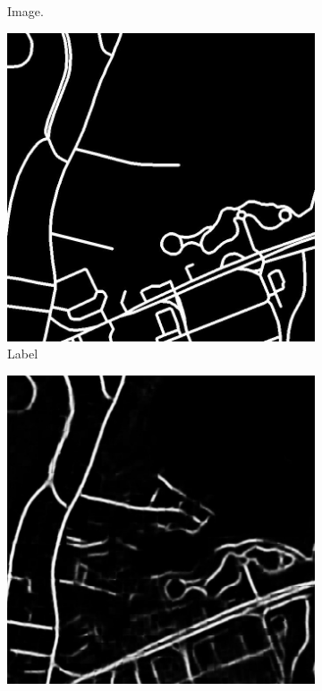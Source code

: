 \begin{figure}[H]
\begin{subfigure}{0.23\textwidth}
\caption{ Image.}
\vspace{0.2cm} %
\end{subfigure}
\hspace*{\fill} %
\begin{subfigure}{0.23\textwidth}
\includegraphics[width=\textwidth]{figs/appendix/label24628885_15.jpg}
\caption{Label}
\vspace{0.2cm} %
\end{subfigure}
\hspace*{\fill} %
\begin{subfigure}{0.23\textwidth}
\includegraphics[width=\textwidth]{figs/appendix/pred24628885_15.jpg}

\end{subfigure}
\end{figure}
